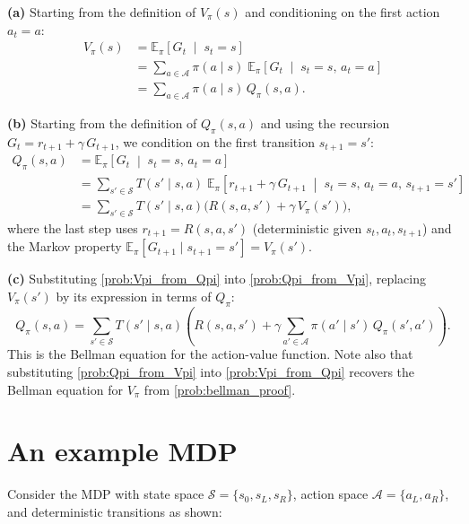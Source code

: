\documentclass[11pt]{article}
\newcommand{\cS}{\mathcal{S}}
\newcommand{\cA}{\mathcal{A}}
\begin{document}
\begin{solution}
\textbf{(a)} Starting from the definition of $V_\pi(s)$ and conditioning on the first action $a_t = a$:
\begin{align*}
V_\pi(s) &= \mathbb{E}_\pi\!\left[G_t \;\middle|\; s_t = s\right] \\
&= \sum_{a \in \cA} \pi(a \mid s)\; \mathbb{E}_\pi\!\left[G_t \;\middle|\; s_t = s,\, a_t = a\right] \\
&= \sum_{a \in \cA} \pi(a \mid s)\, Q_\pi(s, a).
\end{align*}

\textbf{(b)} Starting from the definition of $Q_\pi(s,a)$ and using the recursion $G_t = r_{t+1} + \gamma\, G_{t+1}$, we condition on the first transition $s_{t+1} = s'$:
\begin{align*}
Q_\pi(s,a) &= \mathbb{E}_\pi\!\left[G_t \;\middle|\; s_t = s,\, a_t = a\right] \\
&= \sum_{s' \in \cS} T(s' \mid s, a)\; \mathbb{E}_\pi\!\left[r_{t+1} + \gamma\, G_{t+1} \;\middle|\; s_t = s,\, a_t = a,\, s_{t+1} = s'\right] \\
&= \sum_{s' \in \cS} T(s' \mid s, a)\bigl(R(s, a, s') + \gamma\, V_\pi(s')\bigr),
\end{align*}
where the last step uses $r_{t+1} = R(s,a,s')$ (deterministic given $s_t, a_t, s_{t+1}$) and the Markov property $\mathbb{E}_\pi[G_{t+1} \mid s_{t+1} = s'] = V_\pi(s')$.

\textbf{(c)} Substituting \cref{prob:Vpi_from_Qpi} into \cref{prob:Qpi_from_Vpi}, replacing $V_\pi(s')$ by its expression in terms of $Q_\pi$:
$$
Q_\pi(s, a) = \sum_{s' \in \cS} T(s' \mid s, a)\!\left(R(s, a, s') + \gamma \sum_{a' \in \cA} \pi(a' \mid s')\, Q_\pi(s', a')\right).
$$
This is the Bellman equation for the action-value function. Note also that substituting \cref{prob:Qpi_from_Vpi} into \cref{prob:Vpi_from_Qpi} recovers the Bellman equation for $V_\pi$ from \cref{prob:bellman_proof}.
\end{solution}


\section{An example MDP}\label{prob:small_mdp}

Consider the MDP with state space $\cS = \{s_0, s_L, s_R\}$, action space $\cA = \{a_L, a_R\}$, and deterministic transitions as shown:
\end{document}
